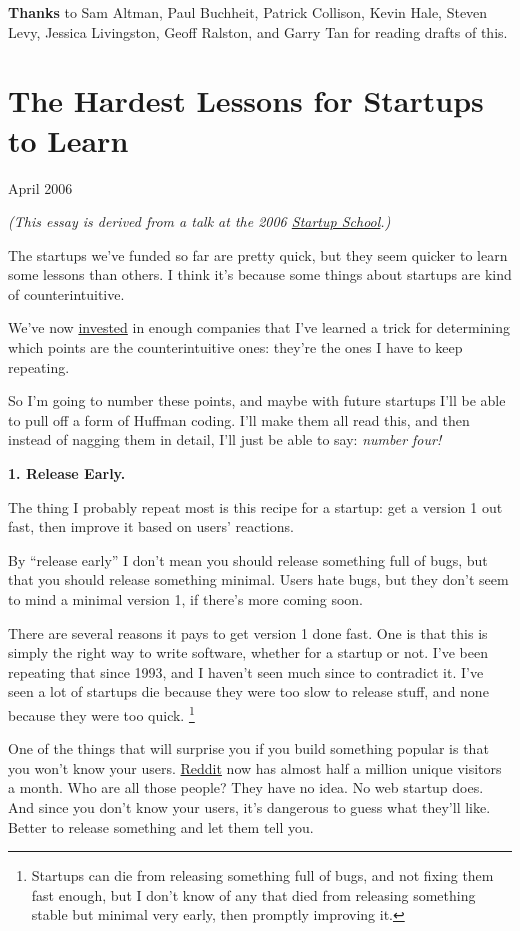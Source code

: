 \documentclass[12pt]{book}
\begin{document}
\textbf{Thanks} to Sam Altman, Paul Buchheit, Patrick Collison, Kevin
Hale, Steven Levy, Jessica Livingston, Geoff Ralston, and Garry Tan for
reading drafts of this.
\chapter{The Hardest Lessons for Startups to Learn}

April 2006

\emph{(This essay is derived from a talk at the 2006
\href{http://startupschool.org}{Startup School}.)}

The startups we've funded so far are pretty quick, but they seem quicker
to learn some lessons than others. I think it's because some things
about startups are kind of counterintuitive.

We've now \href{http://ycombinator.com}{invested} in enough companies
that I've learned a trick for determining which points are the
counterintuitive ones: they're the ones I have to keep repeating.

So I'm going to number these points, and maybe with future startups I'll
be able to pull off a form of Huffman coding. I'll make them all read
this, and then instead of nagging them in detail, I'll just be able to
say: \emph{number four!}

\textbf{1. Release Early.}

The thing I probably repeat most is this recipe for a startup: get a
version 1 out fast, then improve it based on users' reactions.

By ``release early'' I don't mean you should release something full of
bugs, but that you should release something minimal. Users hate bugs,
but they don't seem to mind a minimal version 1, if there's more coming
soon.

There are several reasons it pays to get version 1 done fast. One is
that this is simply the right way to write software, whether for a
startup or not. I've been repeating that since 1993, and I haven't seen
much since to contradict it. I've seen a lot of startups die because
they were too slow to release stuff, and none because they were too
quick. \footnote{Startups can die from releasing something full of bugs, and not
fixing them fast enough, but I don't know of any that died from
releasing something stable but minimal very early, then promptly
improving it.}

One of the things that will surprise you if you build something popular
is that you won't know your users. \href{http://reddit.com}{Reddit} now
has almost half a million unique visitors a month. Who are all those
people? They have no idea. No web startup does. And since you don't know
your users, it's dangerous to guess what they'll like. Better to release
something and let them tell you.
\end{document}
